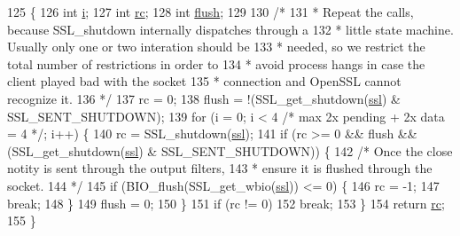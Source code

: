 \begin{DoxyCode}
125 \{
126     \textcolor{keywordtype}{int} \hyperlink{group__MOD__PROXY_ga38403a0592eb8018a3ad61aef0f7ca2c}{i};
127     \textcolor{keywordtype}{int} \hyperlink{group__APACHE__CORE__CONFIG_ga2e051c0ce9ee165170cd7973f2464512}{rc};
128     \textcolor{keywordtype}{int} \hyperlink{group__APACHE__CORE__CONNECTION_ga0e45940edc0a96a29eea9b91650341ae}{flush};
129 
130     \textcolor{comment}{/*}
131 \textcolor{comment}{     * Repeat the calls, because SSL\_shutdown internally dispatches through a}
132 \textcolor{comment}{     * little state machine. Usually only one or two interation should be}
133 \textcolor{comment}{     * needed, so we restrict the total number of restrictions in order to}
134 \textcolor{comment}{     * avoid process hangs in case the client played bad with the socket}
135 \textcolor{comment}{     * connection and OpenSSL cannot recognize it.}
136 \textcolor{comment}{     */}
137     rc = 0;
138     flush = !(SSL\_get\_shutdown(\hyperlink{group__MOD__SSL_ga91d808d6c1c01029f9c9260b9b69a437}{ssl}) & SSL\_SENT\_SHUTDOWN);
139     \textcolor{keywordflow}{for} (i = 0; i < 4 \textcolor{comment}{/* max 2x pending + 2x data = 4 */}; i++) \{
140         rc = SSL\_shutdown(\hyperlink{group__MOD__SSL_ga91d808d6c1c01029f9c9260b9b69a437}{ssl});
141         \textcolor{keywordflow}{if} (rc >= 0 && flush && (SSL\_get\_shutdown(\hyperlink{group__MOD__SSL_ga91d808d6c1c01029f9c9260b9b69a437}{ssl}) & SSL\_SENT\_SHUTDOWN)) \{
142             \textcolor{comment}{/* Once the close notity is sent through the output filters,}
143 \textcolor{comment}{             * ensure it is flushed through the socket.}
144 \textcolor{comment}{             */}
145             \textcolor{keywordflow}{if} (BIO\_flush(SSL\_get\_wbio(\hyperlink{group__MOD__SSL_ga91d808d6c1c01029f9c9260b9b69a437}{ssl})) <= 0) \{
146                 rc = -1;
147                 \textcolor{keywordflow}{break};
148             \}
149             flush = 0;
150         \}
151         \textcolor{keywordflow}{if} (rc != 0)
152             \textcolor{keywordflow}{break};
153     \}
154     \textcolor{keywordflow}{return} \hyperlink{group__APACHE__CORE__CONFIG_ga2e051c0ce9ee165170cd7973f2464512}{rc};
155 \}
\end{DoxyCode}
